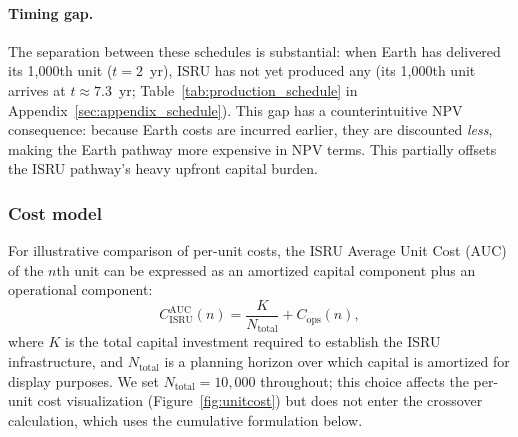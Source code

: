 \documentclass[preprint,12pt]{elsarticle}
\begin{document}
\paragraph{Timing gap.} The separation between these schedules is substantial: when Earth has delivered its 1{,}000th unit ($t = 2$~yr), ISRU has not yet produced any (its 1{,}000th unit arrives at $t \approx 7.3$~yr; Table~\ref{tab:production_schedule} in Appendix~\ref{sec:appendix_schedule}). This gap has a counterintuitive NPV consequence: because Earth costs are incurred earlier, they are discounted \emph{less}, making the Earth pathway more expensive in NPV terms. This partially offsets the ISRU pathway's heavy upfront capital burden.

\subsubsection{Cost model}

For illustrative comparison of per-unit costs, the ISRU Average Unit Cost (AUC) of the $n$th unit can be expressed as an amortized capital component plus an operational component:
\begin{equation}
  C_{\mathrm{ISRU}}^{\mathrm{AUC}}(n) = \frac{K}{N_{\mathrm{total}}} + C_{\mathrm{ops}}(n),
  \label{eq:isru_unit}
\end{equation}
where $K$ is the total capital investment required to establish the ISRU infrastructure, and $N_{\mathrm{total}}$ is a planning horizon over which capital is amortized for display purposes. We set $N_{\mathrm{total}} = 10{,}000$ throughout; this choice affects the per-unit cost visualization (Figure~\ref{fig:unitcost}) but does not enter the crossover calculation, which uses the cumulative formulation below.
\end{document}
